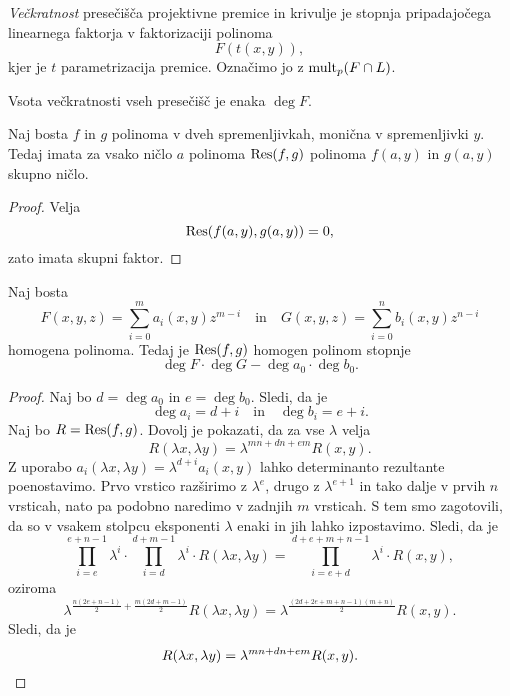 
\begin{definicija}
\emph{Večkratnost} presečišča
projektivne premice in krivulje je stopnja pripadajočega linearnega
faktorja v faktorizaciji polinoma
\[
F(t(x,y)),
\]
kjer je $t$ parametrizacija premice. Označimo jo z
$\operatorname{mult}_p(F \cap L)$.
\end{definicija}

\begin{opomba}
Vsota večkratnosti vseh presečišč je enaka $\deg F$.
\end{opomba}

\begin{trditev}
Naj bosta $f$ in $g$ polinoma v dveh spremenljivkah, monična v
spremenljivki $y$. Tedaj imata za vsako ničlo $a$ polinoma
$\operatorname{Res}(f,g)$ polinoma $f(a, y)$ in $g(a, y)$ skupno ničlo.
\end{trditev}

\begin{proof}
Velja
\[
\operatorname{Res}(f(a, y), g(a, y)) = 0,
\]
zato imata skupni faktor.
\end{proof}

\begin{trditev}
Naj bosta
\[
F(x, y, z) = \sum_{i=0}^m a_i(x,y) z^{m-i}
\quad \text{in} \quad
G(x, y, z) = \sum_{i=0}^n b_i(x,y) z^{n-i}
\]
homogena polinoma. Tedaj je $\operatorname{Res}(f,g)$ homogen polinom stopnje
\[
\deg F \cdot \deg G - \deg a_0 \cdot \deg b_0.
\]
\end{trditev}

\begin{proof}
Naj bo $d = \deg a_0$ in $e = \deg b_0$. Sledi, da je
\[
\deg a_i = d + i
\quad \text{in} \quad
\deg b_i = e + i.
\]
Naj bo $R = \operatorname{Res}(f, g)$. Dovolj je pokazati, da za vse $\lambda$
velja
\[
R(\lambda x, \lambda y) = \lambda^{mn + dn + em} R(x, y).
\]
Z uporabo $a_i(\lambda x, \lambda y) = \lambda^{d + i} a_i(x, y)$
lahko determinanto rezultante poenostavimo. Prvo vrstico razširimo
z $\lambda^e$, drugo z $\lambda^{e+1}$ in tako dalje v prvih $n$
vrsticah, nato pa podobno naredimo v zadnjih $m$ vrsticah. S tem
smo zagotovili, da so v vsakem stolpcu eksponenti $\lambda$ enaki
in jih lahko izpostavimo. Sledi, da je
\[
\prod_{i=e}^{e+n-1} \lambda^i \cdot
\prod_{i=d}^{d+m-1} \lambda^i \cdot
R(\lambda x, \lambda y) =
\prod_{i=e+d}^{d+e+m+n-1} \lambda^i \cdot R(x, y),
\]
oziroma
\[
\lambda^{\frac{n (2e + n - 1)}{2} + \frac{m(2d + m - 1)}{2}}
R(\lambda x, \lambda y) =
\lambda^{\frac{(2d + 2e + m + n - 1)(m + n)}{2}} R(x, y).
\]
Sledi, da je
\[
R(\lambda x, \lambda y) = \lambda^{mn + dn + em} R(x, y). \qedhere
\]
\end{proof}

